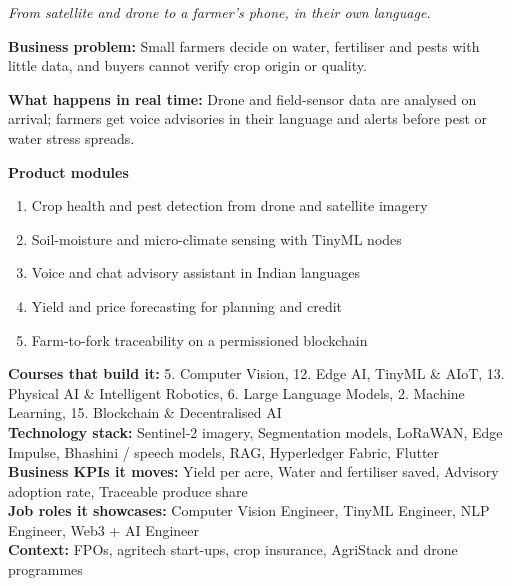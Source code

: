 \documentclass[10pt,a4paper]{article}
\begin{document}
\begin{tcolorbox}[enhanced,breakable,colback=white,colframe=navy,boxrule=0.6pt,arc=2pt,title={\color{goldl}PRODUCT 8 \;|\; AGRICULTURE \& FOOD\\\color{white}\large Precision Agriculture Intelligence Platform},colbacktitle=navy,fonttitle=\small\bfseries]
{\small\itshape\color{muted}From satellite and drone to a farmer's phone, in their own language.}\par
\begin{tcolorbox}[colback=l1bg,colframe=l1bg,arc=2pt,borderline west={3pt}{0pt}{saffron},top=2pt,bottom=2pt]\small\textbf{Business problem:} Small farmers decide on water, fertiliser and pests with little data, and buyers cannot verify crop origin or quality.\end{tcolorbox}
\begin{tcolorbox}[colback=l3bg,colframe=l3bg,arc=2pt,borderline west={3pt}{0pt}{igreen},top=2pt,bottom=2pt]\small\textbf{What happens in real time:} Drone and field-sensor data are analysed on arrival; farmers get voice advisories in their language and alerts before pest or water stress spreads.\end{tcolorbox}
{\small\textbf{Product modules}}\begin{enumerate}\small
\item Crop health and pest detection from drone and satellite imagery
\item Soil-moisture and micro-climate sensing with TinyML nodes
\item Voice and chat advisory assistant in Indian languages
\item Yield and price forecasting for planning and credit
\item Farm-to-fork traceability on a permissioned blockchain
\end{enumerate}
{\small\textbf{Courses that build it:} 5. Computer Vision, 12. Edge AI, TinyML \& AIoT, 13. Physical AI \& Intelligent Robotics, 6. Large Language Models, 2. Machine Learning, 15. Blockchain \& Decentralised AI\\\textbf{Technology stack:} Sentinel-2 imagery, Segmentation models, LoRaWAN, Edge Impulse, Bhashini / speech models, RAG, Hyperledger Fabric, Flutter\\\textbf{Business KPIs it moves:} Yield per acre, Water and fertiliser saved, Advisory adoption rate, Traceable produce share\\\textbf{Job roles it showcases:} Computer Vision Engineer, TinyML Engineer, NLP Engineer, Web3 + AI Engineer\\\textbf{Context:} FPOs, agritech start-ups, crop insurance, AgriStack and drone programmes}
\end{tcolorbox}
\end{document}
